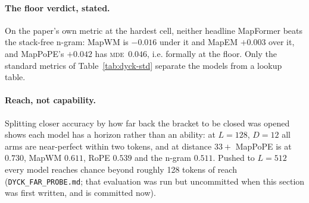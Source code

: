 \documentclass[10pt]{article}
\newcommand{\mde}{\textsc{mde}}
\begin{document}
\paragraph{The floor verdict, stated.} On the paper's own metric at the hardest cell, neither headline MapFormer beats the stack-free n-gram: MapWM is $-0.016$ under it and MapEM $+0.003$ over it, and MapPoPE's $+0.042$ has \mde\ $0.046$, i.e. formally at the floor. Only the standard metrics of Table~\ref{tab:dyck-std} separate the models from a lookup table.

\paragraph{Reach, not capability.} Splitting closer accuracy by how far back the bracket to be closed was
opened shows each model has a horizon rather than an ability: at $L=128$, $D=12$ all arms are near-perfect
within two tokens, and at distance $33+$ MapPoPE is at $0.730$, MapWM $0.611$, RoPE $0.539$ and the n-gram
$0.511$. Pushed to $L=512$ every model reaches chance beyond roughly 128 tokens of reach (\texttt{DYCK\_FAR\_PROBE.md}; that evaluation was run but uncommitted when this section was first written, and is committed now).
\end{document}
